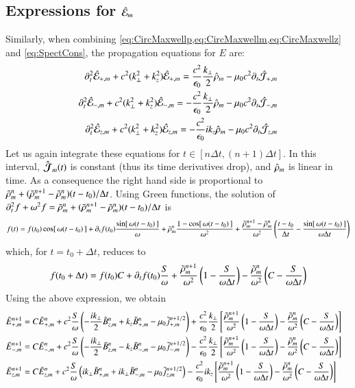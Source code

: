 \subsection{Expressions for $\hat{\mathcal{E}}_m$}

Similarly, when combining \cref{eq:CircMaxwellp,eq:CircMaxwellm,eq:CircMaxwellz}
and \cref{eq:SpectCons}, the propagation equations for $E$ are:
\begin{align*}
\partial_t^2 \hat{\mathcal{E}}_{+,m} + c^2(k_\perp^2 + k_z^2) \hat{\mathcal{E}}_{+,m}
= \frac{c^2}{\epsilon_0} \frac{k_\perp}{2} \hat{\mathcal{\rho}}_m -
\mu_0c^2 \partial_t\hat{\mathcal{J}}_{+,m} \\
\partial_t^2 \hat{\mathcal{E}}_{-,m} + c^2(k_\perp^2 + k_z^2) \hat{\mathcal{E}}_{-,m}
= - \frac{c^2}{\epsilon_0} \frac{k_\perp}{2} \hat{\mathcal{\rho}}_m -
\mu_0c^2 \partial_t\hat{\mathcal{J}}_{-,m} \\
\partial_t^2 \hat{\mathcal{E}}_{z,m} + c^2(k_\perp^2 + k_z^2) \hat{\mathcal{E}}_{z,m}
= - \frac{c^2}{\epsilon_0} i k_z \hat{\mathcal{\rho}}_m -
\mu_0c^2 \partial_t\hat{\mathcal{J}}_{z,m} 
\end{align*}
Let us again integrate these equations for $t\in [n\Delta t, (n+1)\Delta
t]$. In this interval, $\boldsymbol{\hat{\mathcal{J}}}_m(t)$ is constant (thus its time
derivatives drop), and $\hat{\mathcal{\rho}}_m$ is linear in time. As a
consequence the right hand side is proportional to $\tilde{\rho}_{m}^{n} +
(\tilde{\rho}_{m}^{n+1}-\tilde{\rho}_{m}^{n})(t-t_0)/\Delta t$. Using Green functions, the solution of 
$ \partial_t^2 f + \omega^2 f = \tilde{\rho}_{m}^{n} + (\tilde{\rho}_{m}^{n+1}-\tilde{\rho}_{m}^{n})(t-t_0)/\Delta t $ is
\[ f(t) = f(t_0) \cos[\,\omega(t-t_0)\,] + \partial_tf (t_0)
\frac{\sin[\,\omega(t-t_0)\,]}{\omega} + \tilde{\rho}_{m}^{n}\frac{1-
  \cos[\,\omega(t-t_0)\,]}{\omega^2} + \frac{\tilde{\rho}_{m}^{n+1}-\tilde{\rho}_{m}^{n}}{\omega^2}\left(
  \frac{t-t_0}{\Delta t} - \frac{\sin[\,\omega(t-t_0)\,]}{\omega
    \Delta t}
\right) \]
which, for $t=t_0 +\Delta t$, reduces to
\[ f(t_0 +\Delta t) = f(t_0) C + \partial_tf (t_0)
\frac{S}{\omega} 
+ \frac{\tilde{\rho}_{m}^{n+1}}{\omega^2}\left( 1 - \frac{S}{\omega\Delta t}\right) 
- \frac{\tilde{\rho}_{m}^{n}}{\omega^2}\left( C - \frac{S}{\omega\Delta t}\right) \]
Using the above expression, we obtain
\begin{align*}
\tilde{E}_{+,m}^{n+1} = \; & C \tilde{E}_{+,m}^{n} + 
c^2\frac{S}{\omega}\left(-\frac{ik_\perp }{2} \tilde{B}_{z,m}^{n} + k_z\tilde{B}_{+,m}^{n}
- \mu_0 \tilde{j}_{+,m}^{n+1/2} \right) + \frac{c^2}{\epsilon_0}
\frac{k_\perp}{2}\left[ \frac{\tilde{\rho}_{m}^{n+1}}{\omega^2}\left(
  1 - \frac{S}{\omega\Delta t}\right) -
\frac{\tilde{\rho}_{m}^{n}}{\omega^2}\left( C -\frac{S}{\omega\Delta t}\right)\right]  & \\
\tilde{E}_{-,m}^{n+1} =\; & C \tilde{E}_{-,m}^{n} +
c^2\frac{S}{\omega}\left(- \frac{ik_\perp }{2} \tilde{B}_{z,m}^{n} - k_z\tilde{B}_{-,m}^{n}
- \mu_0 \tilde{j}_{-,m}^{n+1/2} \right) - \frac{c^2}{\epsilon_0}
\frac{k_\perp}{2}\left[ \frac{\tilde{\rho}_{m}^{n+1}}{\omega^2}\left(
  1 - \frac{S}{\omega\Delta t}\right) - \frac{\tilde{\rho}_{m}^{n}}{\omega^2}
\left( C - \frac{S}{\omega\Delta t}\right)\right]  &\\
\tilde{E}_{z,m}^{n+1} =\; & C \tilde{E}_{z,m}^{n} + 
c^2\frac{S}{\omega}\left(ik_\perp \tilde{B}_{+,m}^{n} + ik_\perp \tilde{B}_{-,m}^{n}
- \mu_0 \tilde{j}_{z,m}^{n+1/2} \right) - \frac{c^2}{\epsilon_0}
ik_z\left[ \frac{\tilde{\rho}_{m}^{n+1}}{\omega^2}\left(
  1 - \frac{S}{\omega\Delta t}\right) - \frac{\tilde{\rho}_{m}^{n}}{\omega^2}
\left( C - \frac{S}{\omega\Delta t}\right)\right]  &
\end{align*}

